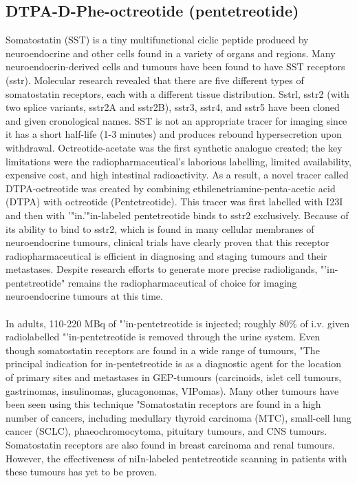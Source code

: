 \documentclass{article}
\begin{document}
\begin{multicols}{2}
\section{DTPA-D-Phe-octreotide (pentetreotide)}
Somatostatin (SST) is a tiny multifunctional ciclic peptide produced by neuroendocrine and other cells found in a variety of organs and regions. Many neuroendocrin-derived cells and tumours have been found to have SST receptors (sstr). Molecular research revealed that there are five different types of somatostatin receptors, each with a different tissue distribution. Sstrl, sstr2 (with two splice variants, sstr2A and sstr2B), sstr3, sstr4, and sstr5 have been cloned and given cronological names. SST is not an appropriate tracer for imaging since it has a short half-life (1-3 minutes) and produces rebound hypersecretion upon withdrawal\cite{oberg2000state}. Octreotide-acetate was the first synthetic analogue created; the key limitations were the radiopharmaceutical's laborious labelling, limited availability, expensive cost, and high intestinal radioactivity. As a result, a novel tracer called DTPA-octreotide was created by combining ethilenetriamine-penta-acetic acid (DTPA) with octreotide (Pentetreotide). This tracer was first labelled with I23I and then with '"in.'"in-labeled pentetreotide binds to sstr2 exclusively. Because of its ability to bind to sstr2, which is found in many cellular membranes of neuroendocrine tumours, clinical trials have clearly proven that this receptor radiopharmaceutical is efficient in diagnosing and staging tumours and their metastases\cite{bajetta2000new}. Despite research efforts to generate more precise radioligands, "'in-pentetreotide" remains the radiopharmaceutical of choice for imaging neuroendocrine tumours at this time.\\ \\
In adults, 110-220 MBq of "'in-pentetreotide is injected; roughly 80\% of i.v. given radiolabelled "'in-pentetreotide is removed through the urine system. Even though somatostatin receptors are found in a wide range of tumours, "The principal indication for in-pentetreotide is as a diagnostic agent for the location of primary sites and metastases in GEP-tumours (carcinoids, islet cell tumours, gastrinomas, insulinomas, glucagonomas, VIPomas). Many other tumours have been seen using this technique "Somatostatin receptors are found in a high number of cancers, including medullary thyroid carcinoma (MTC), small-cell lung cancer (SCLC), phaeochromocytoma, pituitary tumours, and CNS tumours. Somatostatin receptors are also found in breast carcinoma and renal tumours. However, the effectiveness of niIn-labeled pentetreotide scanning in patients with these tumours has yet to be proven.


\end{multicols}
\end{document}
